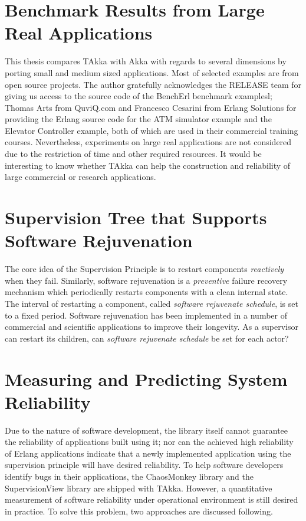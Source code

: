 \section{Benchmark Results from Large Real Applications}

This thesis compares TAkka with Akka with regards to several dimensions by 
porting small and medium sized applications. Most of selected examples are 
from open source projects. The author gratefully acknowledges the RELEASE team 
for giving us access to the source code of the BenchErl benchmark examplesl; 
Thomas Arts from QuviQ.com and Francesco Cesarini from Erlang Solutions for 
providing the Erlang source code for the ATM simulator example and the Elevator 
Controller example, both of which are used in their commercial training 
courses. Nevertheless, experiments on large real applications are not 
considered due to the restriction of time and other required 
resources. It would be interesting to know whether TAkka can help the 
construction and reliability of large commercial or research applications.



\section{Supervision Tree that Supports Software Rejuvenation}

The core idea of the Supervision Principle is to restart components {\it 
reactively} when they fail. Similarly, software rejuvenation 
\citep{huang1995software, dohi2000statistical} is a  {\it preventive} failure 
recovery mechanism which periodically restarts components with a clean internal 
state. The interval of restarting a component, called  {\it software 
rejuvenate schedule}, is set to a fixed period. Software rejuvenation has been 
implemented in a number of commercial and scientific applications to improve 
their longevity. As a supervisor can restart its children, can  {\it software 
rejuvenate schedule} be set for each actor?

\section{Measuring and Predicting System Reliability}

Due to the nature of software development, the library itself cannot guarantee 
the reliability of applications built using it; nor can the achieved 
high reliability of Erlang applications indicate that a newly 
implemented application using the supervision principle will have desired 
reliability.   To help software developers identify bugs in their applications, 
the ChaosMonkey library and the SupervisionView library are shipped with TAkka. 
 However, a quantitative measurement of software reliability under operational 
environment is still desired in practice.  To solve this problem, two 
approaches are discussed following.

